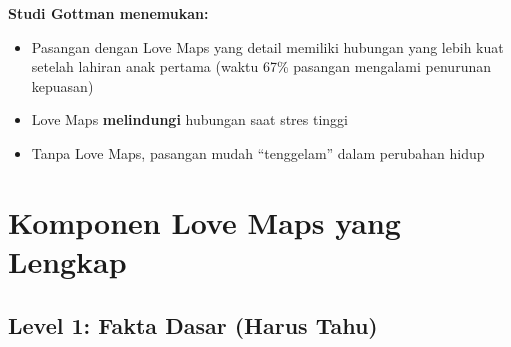 \textbf{Studi Gottman menemukan:}
\begin{itemize}
    \item Pasangan dengan Love Maps yang detail memiliki hubungan yang lebih kuat setelah lahiran anak pertama (waktu 67\% pasangan mengalami penurunan kepuasan)
    \item Love Maps \textbf{melindungi} hubungan saat stres tinggi
    \item Tanpa Love Maps, pasangan mudah ``tenggelam'' dalam perubahan hidup
\end{itemize}

\section{Komponen Love Maps yang Lengkap}

\subsection{Level 1: Fakta Dasar (Harus Tahu)}

